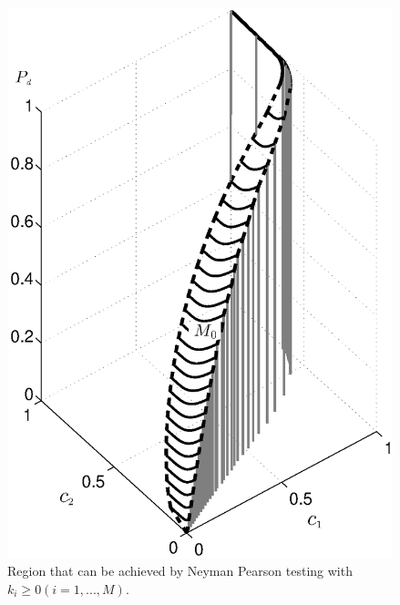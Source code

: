 \begin{figure}[!t]
\centering
\includegraphics[width=12cm, height=16cm]{3/singleROC.eps}
\caption{Region that can be achieved by Neyman Pearson testing with $k_i \geq 0 (i=1, ..., M)$.}
\label{pic: surface for m0 gaussian}
\end{figure}
\newpage

